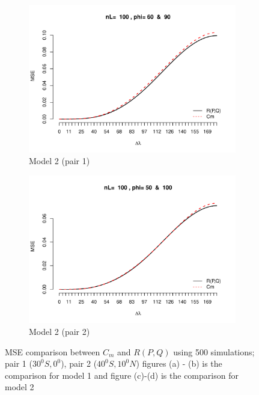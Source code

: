 \begin{figure}[H]
\begin{subfigure}{.5\textwidth}
		\includegraphics[width=1\linewidth]{graphs/MSE_comparison_model2_60_90}
		\caption{Model 2 (pair 1)}
		\label{fig:mse3}
	\end{subfigure}
		\begin{subfigure}{.5\textwidth}
		\centering
		\includegraphics[width=1\linewidth]{graphs/MSE_comparison_model2_50_100}
		\caption{Model 2 (pair 2) }
		\label{fig:mes4}
	\end{subfigure}
	\caption[MSE comparison between $C_m$ and $R(P,Q)$ using 500 simulations]{MSE comparison between $C_m$ and $R(P,Q)$ using 500 simulations; pair 1 ($30^0S,0^0$), pair 2 ($40^0S, 10^0N$) figures (a) - (b) is the comparison for model 1 and figure (c)-(d) is the comparison for model 2 }
	\label{mse_comparison}
\end{figure}

